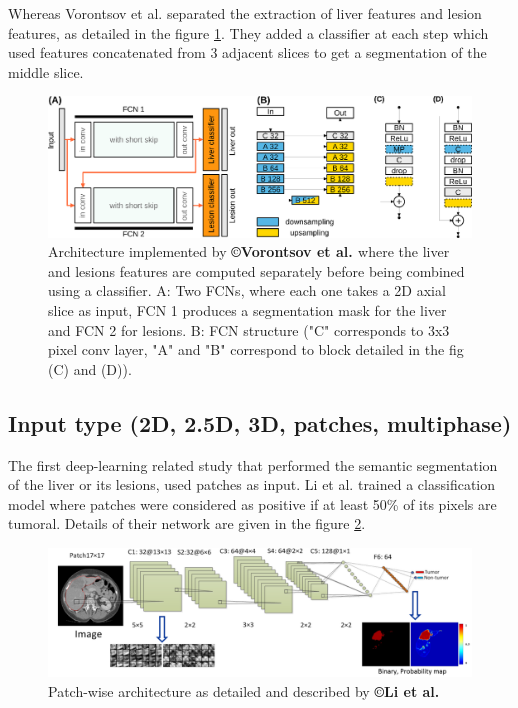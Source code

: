 Whereas Vorontsov et al. \cite{Vorontsov2018} separated the extraction of liver
features and lesion features, as detailed in the figure \ref{Vorontsov2018_Fig1}. They
added a classifier at each step which used features concatenated from 3
adjacent slices to get a segmentation of the middle slice.

\begin{figure}[th!]
	\centering
	\includegraphics[width=0.7\linewidth]{images/Vorontsov2018_Fig1}
	\caption{Architecture implemented by \textbf{©Vorontsov et al. \cite{Vorontsov2018}} where the liver and lesions features are computed separately before being combined using a classifier. A: Two FCNs, where each one takes a 2D axial slice as input, FCN 1 produces a segmentation mask for the liver and FCN 2 for lesions. B: FCN structure ("C" corresponds to 3x3 pixel conv layer, "A" and "B" correspond to block detailed in the fig (C) and (D)).}
	\label{Vorontsov2018_Fig1}
\end{figure}


\subsection{Input type (2D, 2.5D, 3D, patches, multiphase)}

The first deep-learning related study that performed the semantic
segmentation of the liver or its lesions, used patches as input.
Li et al. \cite{Li2015} trained a classification model where patches were
considered as positive if at least 50\% of its pixels are tumoral.
Details of their network are given in the figure \ref{Li2015_Patch_fig}.

\begin{figure}[th!]
	\centering
	\includegraphics[width=0.7\linewidth]{images/image2}
	\caption{Patch-wise architecture as detailed and described by \textbf{©Li et al. \cite{Li2015}}}
	\label{Li2015_Patch_fig}
\end{figure}


